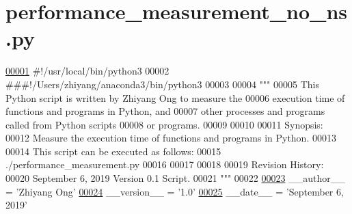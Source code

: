 \hypertarget{performance__measurement__no__ns_8py_source}{}\section{performance\+\_\+measurement\+\_\+no\+\_\+ns.\+py}
\label{performance__measurement__no__ns_8py_source}

\begin{DoxyCode}
\hypertarget{performance__measurement__no__ns_8py_source_l00001}{}\hyperlink{namespaceutilities_1_1timing__measurements_1_1performance__measurement__no__ns}{00001} \textcolor{comment}{#!/usr/local/bin/python3}
00002 \textcolor{comment}{###!/Users/zhiyang/anaconda3/bin/python3}
00003 
00004 \textcolor{stringliteral}{"""}
00005 \textcolor{stringliteral}{    This Python script is written by Zhiyang Ong to measure the}
00006 \textcolor{stringliteral}{        execution time of functions and programs in Python, and}
00007 \textcolor{stringliteral}{        other processes and programs called from Python scripts}
00008 \textcolor{stringliteral}{        or programs.}
00009 \textcolor{stringliteral}{}
00010 \textcolor{stringliteral}{}
00011 \textcolor{stringliteral}{    Synopsis:}
00012 \textcolor{stringliteral}{    Measure the execution time of functions and programs in Python.}
00013 \textcolor{stringliteral}{}
00014 \textcolor{stringliteral}{    This script can be executed as follows:}
00015 \textcolor{stringliteral}{    ./performance\_measurement.py}
00016 \textcolor{stringliteral}{}
00017 \textcolor{stringliteral}{}
00018 \textcolor{stringliteral}{}
00019 \textcolor{stringliteral}{    Revision History:}
00020 \textcolor{stringliteral}{    September 6, 2019           Version 0.1 Script.}
00021 \textcolor{stringliteral}{"""}
00022 
\hypertarget{performance__measurement__no__ns_8py_source_l00023}{}\hyperlink{namespaceutilities_1_1timing__measurements_1_1performance__measurement__no__ns_ad21212ef2a99b878f1d71f04b282ee93}{00023} \_\_author\_\_ = \textcolor{stringliteral}{'Zhiyang Ong'}
\hypertarget{performance__measurement__no__ns_8py_source_l00024}{}\hyperlink{namespaceutilities_1_1timing__measurements_1_1performance__measurement__no__ns_aad2678d45f225046185eb85ebe3cdc6a}{00024} \_\_version\_\_ = \textcolor{stringliteral}{'1.0'}
\hypertarget{performance__measurement__no__ns_8py_source_l00025}{}\hyperlink{namespaceutilities_1_1timing__measurements_1_1performance__measurement__no__ns_a7b90e234766add970bbe1b7f69e543b9}{00025} \_\_date\_\_ = \textcolor{stringliteral}{'September 6, 2019'}

\end{DoxyCode}
